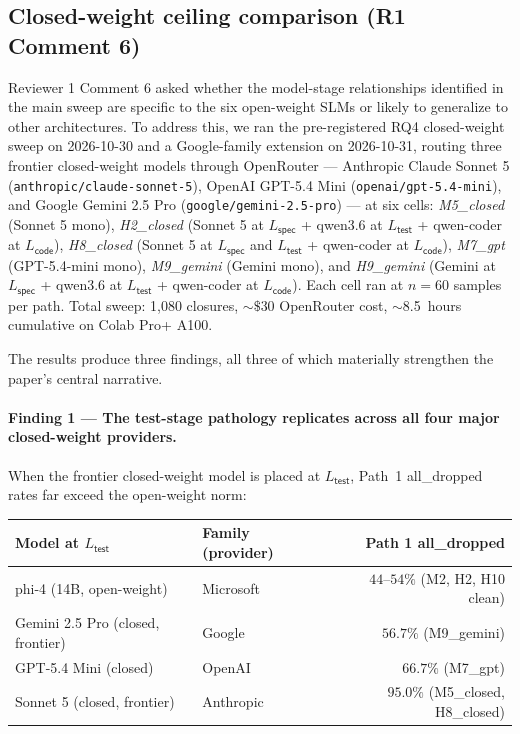 \subsection{Closed-weight ceiling comparison (R1 Comment 6)}
\label{sec:results_rq4_closed_ceiling}

Reviewer 1 Comment 6 asked whether the model-stage relationships identified in the main sweep are specific to the six open-weight SLMs or likely to generalize to other architectures. To address this, we ran the pre-registered RQ4 closed-weight sweep on 2026-10-30 and a Google-family extension on 2026-10-31, routing three frontier closed-weight models through OpenRouter --- Anthropic Claude Sonnet 5 (\texttt{anthropic/claude-sonnet-5}), OpenAI GPT-5.4 Mini (\texttt{openai/gpt-5.4-mini}), and Google Gemini 2.5 Pro (\texttt{google/gemini-2.5-pro}) --- at six cells: \emph{M5\_closed} (Sonnet 5 mono), \emph{H2\_closed} (Sonnet 5 at $L_{\textsf{spec}}$ + qwen3.6 at $L_{\textsf{test}}$ + qwen-coder at $L_{\textsf{code}}$), \emph{H8\_closed} (Sonnet 5 at $L_{\textsf{spec}}$ and $L_{\textsf{test}}$ + qwen-coder at $L_{\textsf{code}}$), \emph{M7\_gpt} (GPT-5.4-mini mono), \emph{M9\_gemini} (Gemini mono), and \emph{H9\_gemini} (Gemini at $L_{\textsf{spec}}$ + qwen3.6 at $L_{\textsf{test}}$ + qwen-coder at $L_{\textsf{code}}$). Each cell ran at $n = 60$ samples per path. Total sweep: 1,080 closures, $\sim$$\$30$ OpenRouter cost, $\sim$8.5~hours cumulative on Colab Pro+ A100.



The results produce three findings, all three of which materially strengthen the paper's central narrative.

\paragraph{Finding 1 --- The test-stage pathology replicates across all four major closed-weight providers.}
When the frontier closed-weight model is placed at $L_{\textsf{test}}$, Path~1 \textsf{all\_dropped} rates far exceed the open-weight norm:

\begin{center}\small
\begin{tabular}{llr}
\toprule
Model at $L_{\textsf{test}}$ & Family (provider) & Path 1 all\_dropped \\
\midrule
phi-4 (14B, open-weight) & Microsoft    & $44$--$54\%$ (M2, H2, H10 clean) \\
Gemini 2.5 Pro (closed, frontier) & Google       & $56.7\%$ (M9\_gemini) \\
GPT-5.4 Mini (closed) & OpenAI       & $66.7\%$ (M7\_gpt) \\
Sonnet 5 (closed, frontier) & Anthropic   & $95.0\%$ (M5\_closed, H8\_closed) \\
\bottomrule
\end{tabular}
\end{center}

